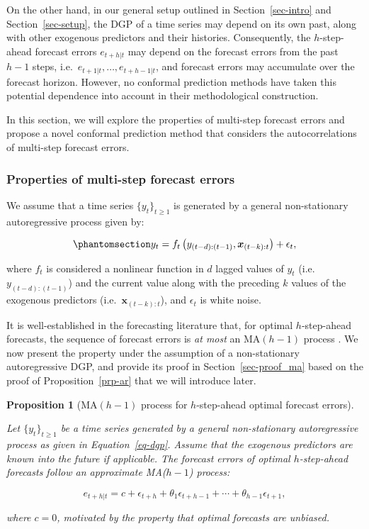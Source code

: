 \documentclass[
  11pt,
  a4paper,
]{article}
\theoremstyle{plain}
\theoremstyle{plain}
\newtheorem{proposition}{Proposition}[section]
\theoremstyle{remark}
\begin{document}
On the other hand, in our general setup outlined in
Section~\ref{sec-intro} and Section~\ref{sec-setup}, the DGP of a time
series may depend on its own past, along with other exogenous predictors
and their histories. Consequently, the \(h\)-step-ahead forecast errors
\(e_{t+h|t}\) may depend on the forecast errors from the past \(h-1\)
steps, i.e.~\(e_{t+1|t}, \ldots, e_{t+h-1|t}\), and forecast errors may
accumulate over the forecast horizon. However, no conformal prediction
methods have taken this potential dependence into account in their
methodological construction.

In this section, we will explore the properties of multi-step forecast
errors and propose a novel conformal prediction method that considers
the autocorrelations of multi-step forecast errors.

\subsubsection{Properties of multi-step forecast errors}\label{sec-ppt}

We assume that a time series \(\{y_t\}_{t \geq 1}\) is generated by a
general non-stationary autoregressive process given by:

\begin{equation}\phantomsection\label{eq-dgp}{
y_t = f_{t}\left(y_{(t-d):(t-1)},\bm{x}_{(t-k):t}\right) + \epsilon_t,
}\end{equation}

where \(f_{t}\) is considered a nonlinear function in \(d\) lagged
values of \(y_t\) (i.e.~\(y_{(t-d):(t-1)}\)) and the current value along
with the preceding \(k\) values of the exogenous predictors
(i.e.~\(\bm{x}_{(t-k):t}\)), and \(\epsilon_t\) is white noise.

It is well-established in the forecasting literature that, for optimal
\(h\)-step-ahead forecasts, the sequence of forecast errors is \emph{at
most} an MA\((h-1)\) process \autocite{harvey1997,diebold2017}. We now
present the property under the assumption of a non-stationary
autoregressive DGP, and provide its proof in Section~\ref{sec-proof_ma}
based on the proof of Proposition~\ref{prp-ar} that we will introduce
later.

\begin{proposition}[MA\((h-1)\) process for \(h\)-step-ahead optimal
forecast errors]\protect\hypertarget{prp-ma}{}\label{prp-ma}

Let \(\{y_t\}_{t \geq 1}\) be a time series generated by a general
non-stationary autoregressive process as given in Equation~\ref{eq-dgp}.
Assume that the exogenous predictors are known into the future if
applicable. The forecast errors of optimal \(h\)-step-ahead forecasts
follow an approximate MA(\(h-1\)) process:

\[
e_{t+h|t} = c + \epsilon_{t+h} + \theta_1\epsilon_{t+h-1} + \cdots + \theta_{h-1}\epsilon_{t+1},
\]

where \(c=0\), motivated by the property that optimal forecasts are
unbiased.

\end{proposition}
\end{document}
